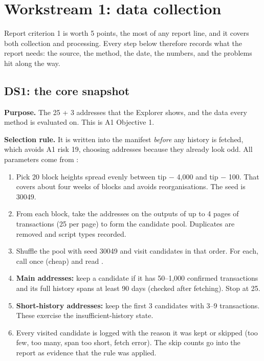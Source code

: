 \section{Workstream 1: data collection}
\label{sec:data}

Report criterion 1 is worth 5 points, the most of any report line, and it covers both collection
and processing. Every step below therefore records what the report needs: the source, the
method, the date, the numbers, and the problems hit along the way.

\subsection{DS1: the core snapshot}
\label{sec:ds1}

\textbf{Purpose.} The 25 + 3 addresses that the Explorer shows, and the data every method is
evaluated on. This is A1 Objective 1.

\textbf{Selection rule.} It is written into the manifest \emph{before} any history is fetched,
which avoids A1 risk 19, choosing addresses because they already look odd. All parameters come
from :
\begin{enumerate}
  \item Pick 20 block heights spread evenly between tip − 4,000 and tip − 100. That covers about
    four weeks of blocks and avoids reorganisations. The seed is 30049.
  \item From each block, take the addresses on the outputs of up to 4 pages of transactions (25
    per page) to form the candidate pool. Duplicates are removed and script types recorded.
  \item Shuffle the pool with seed 30049 and visit candidates in that order. For each, call
     once (cheap) and read .
  \item \textbf{Main addresses:} keep a candidate if it has 50--1,000 confirmed transactions and
    its full history spans at least 90 days (checked after fetching). Stop at 25.
  \item \textbf{Short-history addresses:} keep the first 3 candidates with 3--9 transactions.
    These exercise the insufficient-history state.
  \item Every visited candidate is logged with the reason it was kept or skipped (too few, too
    many, span too short, fetch error). The skip counts go into the report as evidence that
    the rule was applied.
\end{enumerate}

